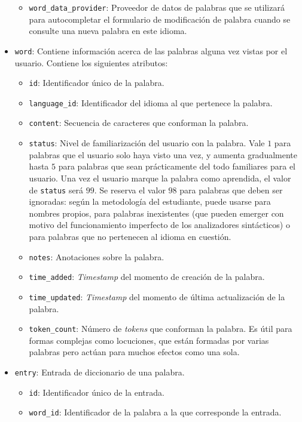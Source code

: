 \begin{itemize}
\begin{itemize}[label=$\star$]
			\item \texttt{word\_data\_provider}: Proveedor de datos de palabras que se utilizará para autocompletar el formulario de modificación de palabra cuando se consulte una nueva palabra en este idioma.
		\end{itemize}
	\item \texttt{word}: Contiene información acerca de las palabras alguna vez vistas por el usuario. Contiene los siguientes atributos:
	\begin{itemize}[label=$\star$]
		\item \texttt{id}: Identificador único de la palabra.
		\item \texttt{language\_id}: Identificador del idioma al que pertenece la palabra.
		\item \texttt{content}: Secuencia de caracteres que conforman la palabra.
		\item \texttt{status}: Nivel de familiarización del usuario con la palabra. Vale $1$ para palabras que el usuario solo haya visto una vez, y aumenta gradualmente hasta $5$ para palabras que sean prácticamente del todo familiares para el usuario. Una vez el usuario marque la palabra como aprendida, el valor de \texttt{status} será $99$. Se reserva el valor $98$ para palabras que deben ser ignoradas: según la metodología del estudiante, puede usarse para nombres propios, para palabras inexistentes (que pueden emerger con motivo del funcionamiento imperfecto de los analizadores sintácticos) o para palabras que no pertenecen al idioma en cuestión.
		\item \texttt{notes}: Anotaciones sobre la palabra.
		\item \texttt{time\_added}: \textit{Timestamp} del momento de creación de la palabra.
		\item \texttt{time\_updated}: \textit{Timestamp} del momento de última actualización de la palabra.
		\item \texttt{token\_count}: Número de \textit{tokens} que conforman la palabra. Es útil para formas complejas como locuciones, que están formadas por varias palabras pero actúan para muchos efectos como una sola.
	\end{itemize}
	\item \texttt{entry}: Entrada de diccionario de una palabra.
	\begin{itemize}[label=$\star$]
		\item \texttt{id}: Identificador único de la entrada.
		\item \texttt{word\_id}: Identificador de la palabra a la que corresponde la entrada.

\end{itemize}
\end{itemize}
